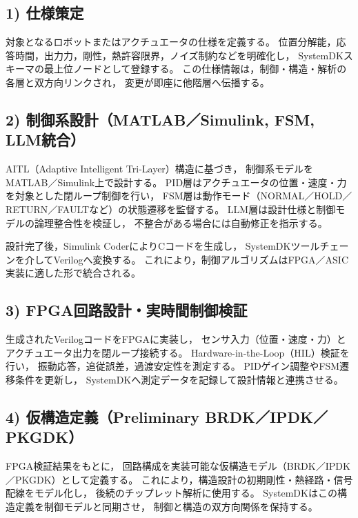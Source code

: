 \subsection{1) 仕様策定}
対象となるロボットまたはアクチュエータの仕様を定義する。
位置分解能，応答時間，出力力，剛性，熱許容限界，ノイズ制約などを明確化し，
SystemDKスキーマの最上位ノードとして登録する。
この仕様情報は，制御・構造・解析の各層と双方向リンクされ，
変更が即座に他階層へ伝播する。

\subsection{2) 制御系設計（MATLAB／Simulink, FSM, LLM統合）}
AITL（Adaptive Intelligent Tri-Layer）構造に基づき，
制御系モデルをMATLAB／Simulink上で設計する。
PID層はアクチュエータの位置・速度・力を対象とした閉ループ制御を行い，
FSM層は動作モード（NORMAL／HOLD／RETURN／FAULTなど）の状態遷移を監督する。
LLM層は設計仕様と制御モデルの論理整合性を検証し，
不整合がある場合には自動修正を指示する。

設計完了後，Simulink CoderによりCコードを生成し，
SystemDKツールチェーンを介してVerilogへ変換する。
これにより，制御アルゴリズムはFPGA／ASIC実装に適した形で統合される。

\subsection{3) FPGA回路設計・実時間制御検証}
生成されたVerilogコードをFPGAに実装し，
センサ入力（位置・速度・力）とアクチュエータ出力を閉ループ接続する。
Hardware-in-the-Loop（HIL）検証を行い，
振動応答，追従誤差，過渡安定性を測定する。
PIDゲイン調整やFSM遷移条件を更新し，
SystemDKへ測定データを記録して設計情報と連携させる。

\subsection{4) 仮構造定義（Preliminary BRDK／IPDK／PKGDK）}
FPGA検証結果をもとに，
回路構成を実装可能な仮構造モデル（BRDK／IPDK／PKGDK）として定義する。
これにより，構造設計の初期剛性・熱経路・信号配線をモデル化し，
後続のチップレット解析に使用する。
SystemDKはこの構造定義を制御モデルと同期させ，
制御と構造の双方向関係を保持する。

